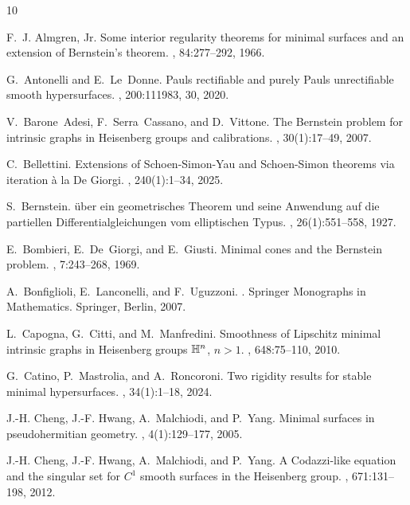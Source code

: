 \documentclass[11pt]{amsart}
\theoremstyle{definition}
\theoremstyle{remark}
\numberwithin{equation}{section}
\begin{document}
\begin{thebibliography}{10}

F.~J. Almgren, Jr.
\newblock Some interior regularity theorems for minimal surfaces and an extension of {B}ernstein's theorem.
, 84:277--292, 1966.

G.~Antonelli and E.~Le~Donne.
\newblock Pauls rectifiable and purely {P}auls unrectifiable smooth hypersurfaces.
, 200:111983, 30, 2020.

V.~Barone~Adesi, F.~Serra~Cassano, and D.~Vittone.
\newblock The {B}ernstein problem for intrinsic graphs in {H}eisenberg groups and calibrations.
, 30(1):17--49, 2007.

C.~Bellettini.
\newblock Extensions of {S}choen-{S}imon-{Y}au and {S}choen-{S}imon theorems via iteration \`a{} la {D}e {G}iorgi.
, 240(1):1--34, 2025.

S.~Bernstein.
\newblock \"uber ein geometrisches {T}heorem und seine {A}nwendung auf die partiellen {D}ifferentialgleichungen vom elliptischen {T}ypus.
, 26(1):551--558, 1927.

E.~Bombieri, E.~De~Giorgi, and E.~Giusti.
\newblock Minimal cones and the {B}ernstein problem.
, 7:243--268, 1969.

A.~Bonfiglioli, E.~Lanconelli, and F.~Uguzzoni.
.
\newblock Springer Monographs in Mathematics. Springer, Berlin, 2007.

L.~Capogna, G.~Citti, and M.~Manfredini.
\newblock Smoothness of {L}ipschitz minimal intrinsic graphs in {H}eisenberg groups {$\Bbb H^n$}, {$n>1$}.
, 648:75--110, 2010.

G.~Catino, P.~Mastrolia, and A.~Roncoroni.
\newblock Two rigidity results for stable minimal hypersurfaces.
, 34(1):1--18, 2024.

J.-H. Cheng, J.-F. Hwang, A.~Malchiodi, and P.~Yang.
\newblock Minimal surfaces in pseudohermitian geometry.
, 4(1):129--177, 2005.

J.-H. Cheng, J.-F. Hwang, A.~Malchiodi, and P.~Yang.
\newblock A {C}odazzi-like equation and the singular set for {$C^1$} smooth surfaces in the {H}eisenberg group.
, 671:131--198, 2012.


\end{thebibliography}
\end{document}

